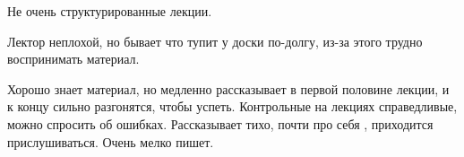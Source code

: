            \begin{commentbox} 
                Не очень структурированные лекции.  
            \end{commentbox} 
        
            \begin{commentbox} 
                Лектор неплохой, но бывает что тупит у доски по-долгу, из-за этого трудно воспринимать материал. 
            \end{commentbox} 
        
            \begin{commentbox} 
                Хорошо знает материал, но медленно рассказывает в первой половине лекции, и к концу сильно  разгонятся, чтобы успеть. Контрольные на лекциях справедливые, можно спросить об ошибках. Рассказывает тихо, почти про себя , приходится прислушиваться. Очень мелко пишет.
            \end{commentbox}


